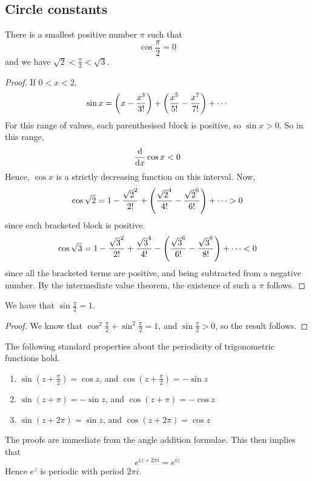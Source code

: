 \subsection{Circle constants}
\begin{proposition}
	There is a smallest positive number \(\pi\) such that
	\[
		\cos \frac{\pi}{2} = 0
	\]
	and we have \(\sqrt{2} < \frac{\pi}{2} < \sqrt{3}\).
\end{proposition}
\begin{proof}
	If \(0 < x < 2\),
	\[
		\sin x = \qty(x - \frac{x^3}{3!}) + \qty(\frac{x^5}{5!} - \frac{x^7}{7!}) + \cdots
	\]
	For this range of values, each parenthesised block is positive, so \(\sin x > 0\).
	So in this range,
	\[
		\dv{x} \cos x < 0
	\]
	Hence, \(\cos x\) is a strictly decreasing function on this interval.
	Now,
	\[
		\cos \sqrt{2} = 1 - \frac{\sqrt{2}^2}{2!} + \qty(\frac{\sqrt{2}^4}{4!} - \frac{\sqrt{2}^6}{6!}) + \cdots > 0
	\]
	since each bracketed block is positive.
	\[
		\cos \sqrt{3} = 1 - \frac{\sqrt{3}^2}{2!} + \frac{\sqrt{3}^4}{4!} - \qty(\frac{\sqrt{3}^6}{6!} - \frac{\sqrt{3}^8}{8!}) + \cdots < 0
	\]
	since all the bracketed terms are positive, and being subtracted from a negative number.
	By the intermediate value theorem, the existence of such a \(\pi\) follows.
\end{proof}
\begin{corollary}
	We have that \(\sin \frac{\pi}{2} = 1\).
\end{corollary}
\begin{proof}
	We know that \(\cos^2 \frac{\pi}{2} + \sin^2 \frac{\pi}{2} = 1\), and \(\sin \frac{\pi}{2} > 0\), so the result follows.
\end{proof}
\begin{theorem}
	The following standard properties about the periodicity of trigonometric functions hold.
	\begin{enumerate}
		\item \(\sin(z + \frac{\pi}{2}) = \cos z\), and \(\cos(z + \frac{\pi}{2}) = -\sin z\)
		\item \(\sin(z + \pi) = -\sin z\), and \(\cos(z + \pi) = -\cos z\)
		\item \(\sin(z + 2 \pi) = \sin z\), and \(\cos(z + 2\pi) = \cos z\)
	\end{enumerate}
\end{theorem}
\noindent The proofs are immediate from the angle addition formulae.
This then implies that
\[
	e^{iz + 2\pi i} = e^{iz}
\]
Hence \(e^{z}\) is periodic with period \(2 \pi i\).
